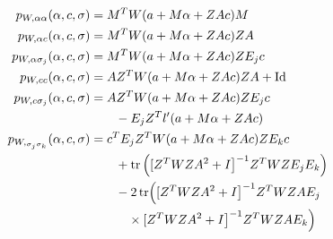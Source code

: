 \begin{subequations}
\begin{align}
   p_{W, \alpha \alpha}(\alpha, c, \sigma)
   & =
   M^T W(a + M \alpha + Z A c) M
   \label{eq:key-rooted-alpha-alpha}
   \\
   p_{W, \alpha c}(\alpha, c, \sigma)
   & =
   M^T W(a + M \alpha + Z A c) Z A
   \label{eq:key-rooted-alpha-c}
   \\
   p_{W, \alpha \sigma_j}(\alpha, c, \sigma)
   & =
   M^T W(a + M \alpha + Z A c) Z E_j c
   \label{eq:key-rooted-alpha-sigma}
   \\
   p_{W, c c}(\alpha, c, \sigma)
   & =
   A Z^T W(a + M \alpha + Z A c) Z A + \text{Id}
   \label{eq:key-rooted-c-c}
   \\
   p_{W, c {\sigma_j}}(\alpha, c, \sigma)
   & =
   A Z^T W(a + M \alpha + Z A c) Z E_j c
   \nonumber
   \\
   & \qquad
   - E_j Z^T l'(a + M \alpha + Z A c)
   \label{eq:key-rooted-c-sigma}
   \\
   p_{W,_{\sigma_j \sigma_k}}(\alpha, c, \sigma)
   & =
   c^T E_j Z^T W(a + M \alpha + Z A c) Z E_k c
   \nonumber
   \\
   & \qquad
   +
   \operatorname{tr}\left( [ Z^T W Z A^2 + I \bigr]^{- 1}
   Z^T W Z E_j E_k
   \right)
   \nonumber
   \\
   & \qquad
   -
   2 \operatorname{tr}\Bigl( [ Z^T W Z A^2 + I \bigr]^{- 1}
   Z^T W Z A E_j
   \nonumber
   \\
   & \qquad
   \quad \times
   [ Z^T W Z A^2 + I \bigr]^{- 1}
   Z^T W Z A E_k
   \Bigr)
   \label{eq:key-rooted-sigma-sigma}
\end{align}
\end{subequations}

